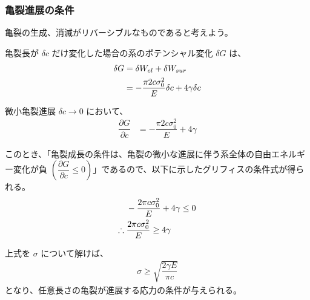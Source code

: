 \documentclass[11pt,a4paper]{jsarticle}
\makeatletter
\def\section{\@startsection 
{section}
{1}
{\z@}
{3.5ex plus -1ex minus -.2ex}
{1.5ex plus .2ex}
{\large\bf}
}
\makeatother
\begin{document}
\begin{appendix}
\subsubsection{亀裂進展の条件}

亀裂の生成、消滅がリバーシブルなものであると考えよう。

亀裂長が $\delta c$ だけ変化した場合の系のポテンシャル変化 $\delta G$ は、
\begin{align}
\delta G 
	&= \delta W_{el} + \delta W_{sur} \notag \\
	&= -\dfrac{\pi 2c \sigma_0^2}{E} \delta c + 4 \gamma \delta c
\end{align}

微小亀裂進展 $\delta c \rightarrow 0$ において、
\begin{align}
\dfrac{\partial G}{\partial c}
	&= -\dfrac{\pi 2c \sigma_0^2}{E} + 4 \gamma
\end{align}

このとき、「亀裂成長の条件は、亀裂の微小な進展に伴う系全体の自由エネルギー変化が負 $\left( \dfrac{\partial G}{\partial c} \leq 0 \right)$」であるので、以下に示したグリフィスの条件式が得られる。
\begin{align}
&-\dfrac{2\pi c \sigma_0^2}{E} + 4 \gamma \leq 0 \notag \\
\therefore \; &\dfrac{2\pi c \sigma_0^2}{E}  \geq 4 \gamma
\end{align}

上式を $\sigma$ について解けば、
\begin{align}
\sigma  \geq \sqrt{ \dfrac{2\gamma E}{\pi c} }
\end{align}
となり、任意長さの亀裂が進展する応力の条件が与えられる。


%
%

\end{appendix}
\end{document}
